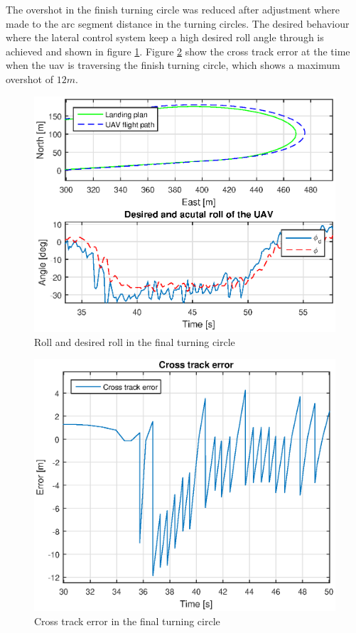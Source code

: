 The overshot in the finish turning circle was reduced after adjustment where made to the arc segment distance in the turning circles. The desired behaviour where the lateral control system keep a high desired roll angle through is achieved and shown in figure \ref{Fig:RollFinalTurning083423}. Figure \ref{Fig:CrossTrackError1juni083423} show the cross track error at the time when the \gls{uav} is traversing the finish turning circle, which shows a maximum overshot of $12 m$.
\newpage
\begin{figure}[H]
\centering
\includegraphics[scale=0.7]{figs/Experiment/Roll1juni083423.eps}
\caption{Roll and desired roll in the final turning circle}
\label{Fig:RollFinalTurning083423}
\end{figure}
\begin{figure}[H]
\centering
\includegraphics[scale=0.7]{figs/Experiment/CrossTrackError1juni083423.eps}
\caption{Cross track error in the final turning circle}
\label{Fig:CrossTrackError1juni083423}
\end{figure}
